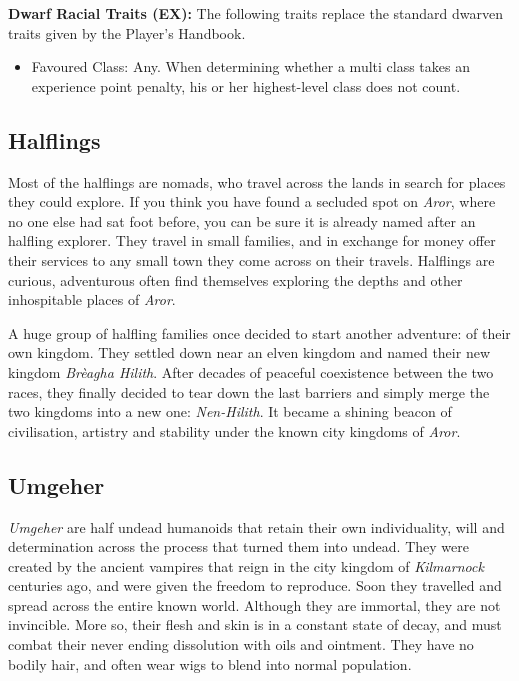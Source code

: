 \begin{35e}
  \textbf{Dwarf Racial Traits (EX):} The following traits replace the standard
  dwarven traits given by the Player's Handbook.
  \begin{itemize}[noitemsep]
    \item Favoured Class: Any. When determining whether a multi class takes an
    experience point penalty, his or her highest-level class does not count.
  \end{itemize}
\end{35e}

\subsection*{Halflings}

Most of the halflings are nomads, who travel across the lands in search for
places they could explore. If you think you have found a secluded spot on
\emph{Aror}, where no one else had sat foot before, you can be sure it is
already named after an halfling explorer. They travel in small families, and
in exchange for money offer their services to any small town they come across
on their travels. Halflings are curious, adventurous often find themselves
exploring the depths and other inhospitable places of \emph{Aror}.

A huge group of halfling families once decided to start another adventure: of
their own kingdom. They settled down near an elven kingdom and named their new
kingdom \emph{Brèagha Hilith}. After decades of peaceful coexistence between
the two races, they finally decided to tear down the last barriers and simply
merge the two kingdoms into a new one: \emph{Nen-Hilith}. It became a shining
beacon of civilisation, artistry and stability under the known city kingdoms
of \emph{Aror}.


\subsection*{Umgeher}



\emph{Umgeher} are half undead humanoids that retain their own individuality,
will and determination across the process that turned them into undead. They
were created by the ancient vampires that reign in the city kingdom of
\emph{Kilmarnock} centuries ago, and were given the freedom to reproduce.
Soon they travelled and spread across the entire known world. Although they
are immortal, they are not invincible. More so, their flesh and skin is in a
constant state of decay, and must combat their never ending dissolution with
oils and ointment. They have no bodily hair, and often wear wigs to blend into
normal population.

